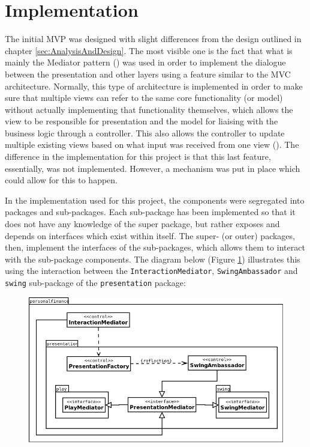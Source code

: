 \section{Implementation} \label{sec:Implementation}

The initial MVP was designed with slight differences from the design outlined
in chapter \ref{sec:AnalysisAndDesign}. The most visible one is the fact that
what is mainly the Mediator pattern
(\cite[][Ch.~9,~Location~3594]{nikolov2016scala}) was used in order to
implement the dialogue between the presentation and other layers using a
feature similar to the MVC architecture. Normally, this type of architecture is
implemented in order to make sure that multiple views can refer to the same
core functionality (or model) without actually implementing that functionality
themselves, which allows the view to be responsible for presentation and the
model for liaising with the business logic through a controller. This also
allows the controller to update multiple existing views based on what input was
received from one view (\cite[][p.~381]{bennett2010object}). The difference in
the implementation for this project is that this last feature, essentially, was
not implemented. However, a mechanism was put in place which could allow for
this to happen.

In the implementation used for this project, the components were segregated
into packages and sub-packages. Each sub-package has been implemented so that
it does not have any knowledge of the super package, but rather exposes and
depends on interfaces which exist within itself. The super- (or outer)
packages, then, implement the interfaces of the sub-packages, which allows them
to interact with the sub-package components. The diagram below (Figure
\ref{fig:PresentationMVC}) illustrates this using the interaction between the
\texttt{InteractionMediator}, \texttt{SwingAmbassador} and \texttt{swing}
sub-package of the \texttt{presentation} package:

\begin{figure}[ht!]
  \begin{center}
    \includegraphics[width=15cm]{contents/img/Package_Diagram_-_Presentation_MVC.png}
  \end{center}
  \caption{}
  \label{fig:PresentationMVC}
\end{figure}
\FloatBarrier



